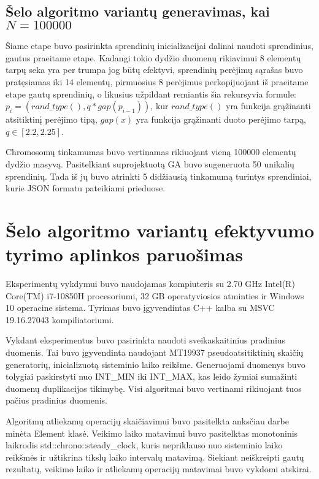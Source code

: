 \documentclass{VUMIFInfKursinis}
\begin{document}
\subsection{Šelo algoritmo variantų generavimas, kai $N = 100000$}

Šiame etape buvo pasirinkta sprendinių inicializacijai dalinai naudoti sprendinius, gautus praeitame etape.
Kadangi tokio dydžio duomenų rikiavimui 8 elementų tarpų seka yra per trumpa jog būtų efektyvi,
sprendinių perėjimų sąrašas buvo pratęsiamas iki 14 elementų, pirmuosius 8 perėjimus perkopijuojant iš praeitame etape gautų sprendinių,
o likusius užpildant remiantis šia rekursyvia formule: $p_i = (rand\_type(), q * gap(p_{i-1}))$,
kur $rand\_type()$ yra funkcija grąžinanti atsitiktinį perėjimo tipą, $gap(x)$ yra funkcija grąžinanti duoto perėjimo tarpą, $q \in \left[2.2, 2.25\right]$.

Chromosomų tinkamumas buvo vertinamas rikiuojant vieną 100000 elementų dydžio masyvą.
Pasitelkiant suprojektuotą GA buvo sugeneruota 50 unikalių sprendinių.
Tada iš jų buvo atrinkti 5 didžiausią tinkamumą turintys sprendiniai, kurie JSON formatu pateikiami prieduose. %

\section{Šelo algoritmo variantų efektyvumo tyrimo aplinkos paruošimas}

Eksperimentų vykdymui buvo naudojamas kompiuteris su 2.70 GHz Intel(R) Core(TM) i7-10850H procesoriumi,
32 GB operatyviosios atminties ir Windows 10 operacine sistema.
Tyrimas buvo įgyvendintas C++ kalba su MSVC 19.16.27043 kompiliatoriumi.

Vykdant eksperimentus buvo pasirinkta naudoti sveikaskaitinius pradinius duomenis.
Tai buvo įgyvendinta naudojant MT19937 pseudoatsitiktinių skaičių generatorių, inicializuotą sisteminio laiko reikšme.
Generuojami duomenys buvo tolygiai paskirstyti nuo INT\_MIN iki INT\_MAX, kas leido žymiai sumažinti duomenų duplikacijos tikimybę.
Visi algoritmai buvo vertinami rikiuojant tuos pačius pradinius duomenis.

Algoritmų atliekamų operacijų skaičiavimui buvo pasitelkta anksčiau darbe minėta Element klasė.
Veikimo laiko matavimui buvo pasitelktas monotoninis laikrodis std::chrono::steady\_clock, kuris nepriklauso nuo sisteminio laiko reikšmės
ir užtikrina tikslų laiko intervalų matavimą.
Siekiant neiškreipti gautų rezultatų, veikimo laiko ir atliekamų operacijų matavimai buvo vykdomi atskirai.
\end{document}
